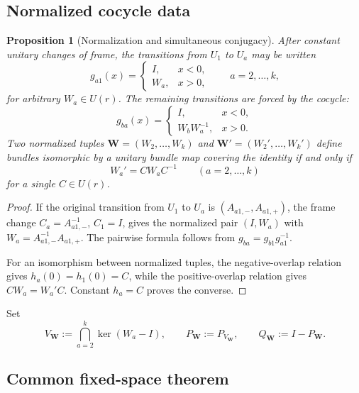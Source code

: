 \documentclass[11pt]{article}
\theoremstyle{plain}
\newtheorem{proposition}[theorem]{Proposition}
\theoremstyle{definition}
\begin{document}
\subsection{Normalized cocycle data}

\begin{proposition}[Normalization and simultaneous conjugacy]
\label{prop:unitary-Lk-normalization}
After constant unitary changes of frame, the transitions from \(U_1\) to \(U_a\) may be written
\[
g_{a1}(x)=
\begin{cases}
I,&x<0,\\
W_a,&x>0,
\end{cases}
\qquad
a=2,\ldots,k,
\]
for arbitrary \(W_a\in U(r)\). The remaining transitions are forced by the cocycle:
\[
g_{ba}(x)=
\begin{cases}
I,&x<0,\\
W_bW_a^{-1},&x>0.
\end{cases}
\]
Two normalized tuples
\(\mathbf W=(W_2,\ldots,W_k)\) and \(\mathbf W'=(W_2',\ldots,W_k')\) define bundles isomorphic by a unitary bundle map covering the identity if and only if
\[
W_a'=CW_aC^{-1}
\qquad(a=2,\ldots,k)
\]
for a single \(C\in U(r)\).
\end{proposition}

\begin{proof}
If the original transition from \(U_1\) to \(U_a\) is
\((A_{a1,-},A_{a1,+})\), the frame change
\(C_a=A_{a1,-}^{-1}\), \(C_1=I\), gives the normalized pair
\((I,W_a)\) with \(W_a=A_{a1,-}^{-1}A_{a1,+}\).
The pairwise formula follows from
\(g_{ba}=g_{b1}g_{a1}^{-1}\).

For an isomorphism between normalized tuples, the negative-overlap relation gives
\(h_a(0)=h_1(0)=C\), while the positive-overlap relation gives
\(CW_a=W_a'C\). Constant \(h_a=C\) proves the converse.
\end{proof}

Set
\[
V_{\mathbf W}:=
\bigcap_{a=2}^{k}\ker(W_a-I),
\qquad
P_{\mathbf W}:=P_{V_{\mathbf W}},
\qquad
Q_{\mathbf W}:=I-P_{\mathbf W}.
\]

\subsection{Common fixed-space theorem}
\end{document}
